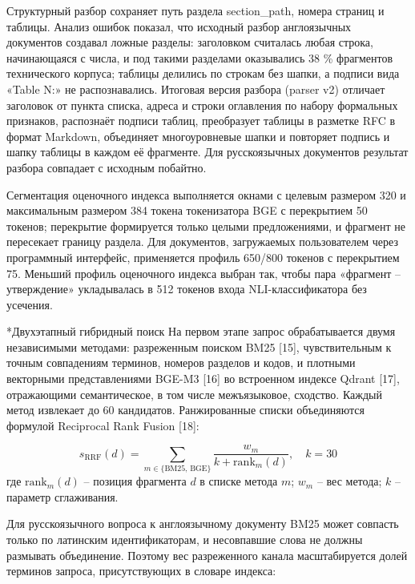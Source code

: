 \documentclass[14pt,a4paper]{extarticle}
\makeatletter
\renewcommand\subsection{\@startsection{subsection}{2}{\z@}{8pt plus 2pt}{4pt}{\normalfont\normalsize\bfseries\itshape\raggedright}}
\makeatother
\begin{document}
Структурный разбор сохраняет путь раздела section\_path, номера страниц и таблицы. Анализ ошибок показал, что исходный разбор англоязычных документов создавал ложные разделы: заголовком считалась любая строка, начинающаяся с числа, и под такими разделами оказывались 38 \% фрагментов технического корпуса; таблицы делились по строкам без шапки, а подписи вида «Table N:» не распознавались. Итоговая версия разбора (parser v2) отличает заголовок от пункта списка, адреса и строки оглавления по набору формальных признаков, распознаёт подписи таблиц, преобразует таблицы в разметке RFC в формат Markdown, объединяет многоуровневые шапки и повторяет подпись и шапку таблицы в каждом её фрагменте. Для русскоязычных документов результат разбора совпадает с исходным побайтно.

Сегментация оценочного индекса выполняется окнами с целевым размером 320 и максимальным размером 384 токена токенизатора BGE с перекрытием 50 токенов; перекрытие формируется только целыми предложениями, и фрагмент не пересекает границу раздела. Для документов, загружаемых пользователем через программный интерфейс, применяется профиль 650/800 токенов с перекрытием 75. Меньший профиль оценочного индекса выбран так, чтобы пара «фрагмент – утверждение» укладывалась в 512 токенов входа NLI-классификатора без усечения.

\subsection*{Двухэтапный гибридный поиск}
На первом этапе запрос обрабатывается двумя независимыми методами: разреженным поиском BM25 [15], чувствительным к точным совпадениям терминов, номеров разделов и кодов, и плотными векторными представлениями BGE-M3 [16] во встроенном индексе Qdrant [17], отражающими семантическое, в том числе межъязыковое, сходство. Каждый метод извлекает до 60 кандидатов. Ранжированные списки объединяются формулой Reciprocal Rank Fusion [18]:

\begin{equation}
s_{\mathrm{RRF}}(d) = \sum_{m \in \{\mathrm{BM25},\, \mathrm{BGE}\}} \frac{w_m}{k + \mathrm{rank}_m(d)}, \quad k = 30
\tag{1}
\end{equation}
\noindent где $\mathrm{rank}_m(d)$ – позиция фрагмента $d$ в списке метода $m$; $w_m$ – вес метода; $k$ – параметр сглаживания.

Для русскоязычного вопроса к англоязычному документу BM25 может совпасть только по латинским идентификаторам, и несовпавшие слова не должны размывать объединение. Поэтому вес разреженного канала масштабируется долей терминов запроса, присутствующих в словаре индекса:
\end{document}
